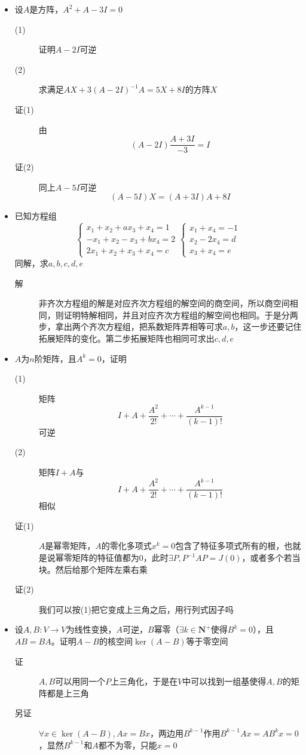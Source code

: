 \begin{itemize}
\item 设$A$是方阵，$A^2+A-3I=0$
\begin{description}
\item[(1)] 证明$A-2I$可逆
\item[(2)] 求满足$AX+3(A-2I)^{-1}A=5X+8I$的方阵$X$
\item[证(1)] 由
\[
(A-2I)\frac{A+3I}{-3}=I
\]
\item[证(2)] 同上$A-5I$可逆
\[
(A-5I)X=(A+3I)A+8I
\]
\end{description}

\item 已知方程组
\[
\begin{cases}
x_1 + x_2+ax_3+x_4=1\\
-x_1 + x_2-x_3+bx_4=2\\
2x_1 + x_2+x_3+x_4=c
\end{cases}
\begin{cases}
x_1 +x_4=-1\\
x_2 - 2x_4=d\\
x_3+x_4=e
\end{cases}
\]
同解，求$a,b,c,d,e$
\begin{description}
\item[解] 非齐次方程组的解是对应齐次方程组的解空间的商空间，所以商空间相同，则证明特解相同，并且对应齐次方程组的解空间也相同。于是分两步，拿出两个齐次方程组，把系数矩阵弄相等可求$a,b$，这一步还要记住拓展矩阵的变化。第二步拓展矩阵也相同可求出$c,d,e$
\end{description}

\item $A$为$n$阶矩阵，且$A^k=0$，证明
\begin{description}
\item[(1)] 矩阵
\[
I+A+\frac{A^2}{2!}+\cdots+\frac{A^{k-1}}{(k-1)!}
\]可逆
\item[(2)] 矩阵$I+A$与
\[
I+A+\frac{A^2}{2!}+\cdots+\frac{A^{k-1}}{(k-1)!}
\]
相似
\item[证(1)] $A$是幂零矩阵，$A$的零化多项式$x^k=0$包含了特征多项式所有的根，也就是说幂零矩阵的特征值都为0，此时$\exists P,P^{-1}AP=J(0)$，或者多个若当块。然后给那个矩阵左乘右乘
\item[证(2)] 我们可以按(1)把它变成上三角之后，用行列式因子吗
\end{description}

\item 设$A,B:V \to V$为线性变换，$A$可逆，$B$幂零（$\exists k \in \mathbf{N}^+$使得$B^k=0$），且$AB=BA$。证明$A-B$的核空间$\ker(A-B)$等于零空间
\begin{description}
\item[证] $A,B$可以用同一个$P$上三角化，于是在$V$中可以找到一组基使得$A,B$的矩阵都是上三角
\item[另证] $\forall x\in \ker(A-B),Ax=Bx$，两边用$B^{k-1}$作用$B^{k-1}Ax=AB^{k}x=0$，显然$B^{k-1}$和$A$都不为零，只能$x=0$
\end{description}


\end{itemize}
